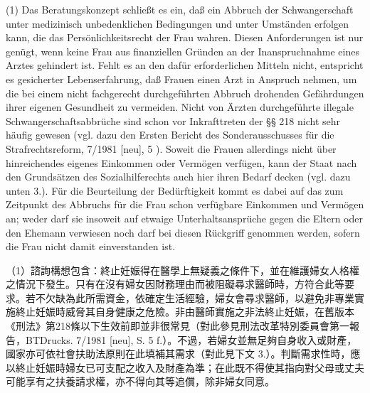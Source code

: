 \documentclass[12pt]{article}
\begin{document}
\begin{sourcepara}[title={原文E.207}]
(1) Das Beratungskonzept schließt es ein, daß ein Abbruch der Schwangerschaft unter medizinisch unbedenklichen Bedingungen und unter Umständen erfolgen kann, die das Persönlichkeitsrecht der Frau wahren. Diesen Anforderungen ist nur genügt, wenn keine Frau aus finanziellen Gründen an der Inanspruchnahme eines Arztes gehindert ist. Fehlt es an den dafür erforderlichen Mitteln nicht, entspricht es gesicherter Lebenserfahrung, daß Frauen einen Arzt in Anspruch nehmen, um die bei einem nicht fachgerecht durchgeführten Abbruch drohenden Gefährdungen ihrer eigenen Gesundheit zu vermeiden. Nicht von Ärzten durchgeführte illegale Schwangerschaftsabbrüche sind schon vor Inkrafttreten der §§ 218 \abbrFF{} \abbrStGB{} \abbrAF{} nicht sehr häufig gewesen (vgl. dazu den Ersten Bericht des Sonderausschusses für die Strafrechtsreform, \abbrBTDrucks{} 7/1981 [neu], \abbrS{} 5 \abbrF{}). Soweit die Frauen allerdings nicht über hinreichendes eigenes Einkommen oder Vermögen verfügen, kann der Staat nach den Grundsätzen des Sozialhilferechts auch hier ihren Bedarf decken (vgl. dazu unten 3.). Für die Beurteilung der Bedürftigkeit kommt es dabei auf das zum Zeitpunkt des Abbruchs für die Frau schon verfügbare Einkommen und Vermögen an; weder darf sie insoweit auf etwaige Unterhaltsansprüche gegen die Eltern oder den Ehemann verwiesen noch darf bei diesen Rückgriff genommen werden, sofern die Frau nicht damit einverstanden ist.
\end{sourcepara}
\begin{transpara}
（1）諮詢構想包含：終止妊娠得在醫學上無疑義之條件下，並在維護婦女人格權之情況下發生。只有在沒有婦女因財務理由而被阻礙尋求醫師時，方符合此等要求。若不欠缺為此所需資金，依確定生活經驗，婦女會尋求醫師，以避免非專業實施終止妊娠時威脅其自身健康之危險。非由醫師實施之非法終止妊娠，在舊版本《刑法》第218條以下生效前即並非很常見（對此參見刑法改革特別委員會第一報告，BTDrucks. 7/1981 [neu], S. 5 f.）。不過，若婦女並無足夠自身收入或財產，國家亦可依社會扶助法原則在此填補其需求（對此見下文 3.）。判斷需求性時，應以終止妊娠時婦女已可支配之收入及財產為準；在此既不得使其指向對父母或丈夫可能享有之扶養請求權，亦不得向其等追償，除非婦女同意。
\end{transpara}
\end{document}
